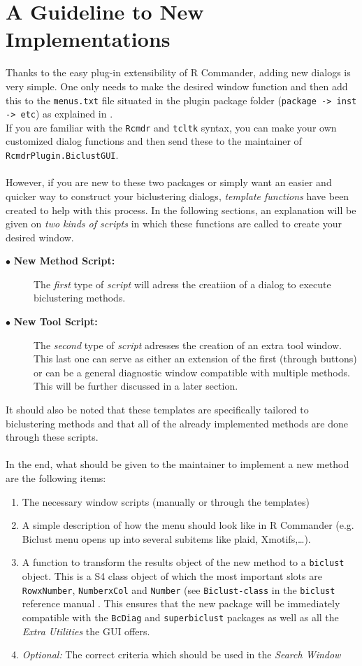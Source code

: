 \documentclass[a4paper]{article}\usepackage[]{graphicx}\usepackage[]{color}
\begin{document}
\section{A Guideline to New Implementations}\label{sec:guideline}
Thanks to the easy plug-in extensibility of R Commander, adding new dialogs is
very simple. One only needs to make the desired window function and then add
this to the \verb|menus.txt| file situated in the plugin package folder
(\verb|package -> inst -> etc|) as explained in \citet{Fox2007}.\\
If you are familiar with the \verb|Rcmdr| and \verb|tcltk| syntax, you can make
your own customized dialog functions and then send these to the maintainer of
\verb|RcmdrPlugin.BiclustGUI|. \\ \\
However, if you are new to these two packages or simply want an easier and
quicker way to construct your biclustering dialogs, {\it template functions} have been
created to help with this process. In the following sections, an explanation
will be given on {\it two kinds of scripts} in which these functions are called to
create your desired window. 
\begin{description}
  \item[$\bullet$ {\bf New Method Script: }] The {\it first} type of {\it script } will adress the creatiion of a
  dialog to execute biclustering methods.
  \item[$\bullet$ {\bf New Tool Script: }] The {\it second} type of {\it script } adresses the creation of an extra
  tool window. This last one can serve as either an extension of the first (through buttons) or can be a
general diagnostic window compatible with multiple methods. This will be
further discussed in a later section.
\end{description}
\noindent It should also be noted that these templates are specifically tailored
to biclustering methods and that all of the already implemented methods are done
through these scripts.
\\ \\
In the end, what should be given to the maintainer to implement a new method are
the following items:
\begin{enumerate}
  \item The necessary window scripts (manually or through the templates)
  \item A simple description of how the menu should look like in R Commander
  (e.g. Biclust menu opens up into several subitems like plaid, Xmotifs,\dots ).
  \item  A function to transform the results object of the new method to a
  \texttt{biclust} object. This is a S4 class object of which the most important
  slots are \texttt{RowxNumber}, \texttt{NumberxCol} and \texttt{Number} (see
  \texttt{Biclust-class} in the \texttt{biclust} reference manual
  \citep{Kaiser2014}.
  This ensures that the new package will be immediately compatible with the
  \texttt{BcDiag} and \texttt{superbiclust} packages as well as all the
  {\it Extra Utilities} the GUI offers.
  \item {\it Optional:} The correct criteria which should be used in the {\it Search Window}
\end{enumerate}
\end{document}
